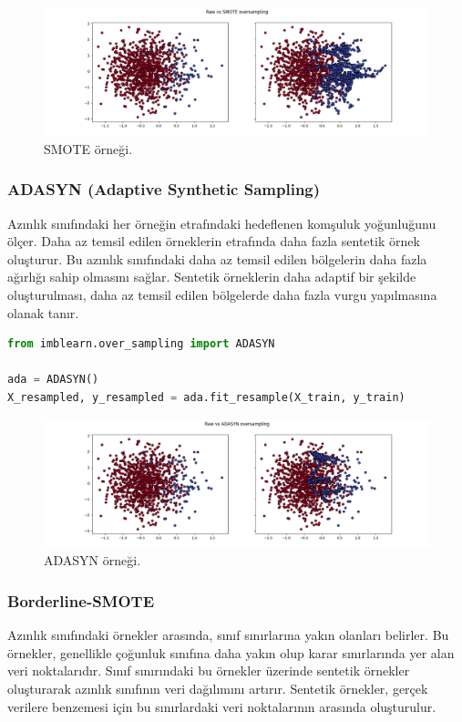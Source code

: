 \begin{figure}[h]
    \centering
    \includegraphics[width=1\textwidth]{images/Raw vs SMOTE oversampling.png}
    \caption{SMOTE örneği.}
    \label{fig:enter-label}
\end{figure}

\subsubsection{ADASYN (Adaptive Synthetic Sampling)}
Azınlık sınıfındaki her örneğin etrafındaki hedeflenen komşuluk yoğunluğunu ölçer. Daha az temsil edilen örneklerin etrafında daha fazla sentetik örnek oluşturur. Bu azınlık sınıfındaki daha az temsil edilen bölgelerin daha fazla ağırlığı sahip olmasını sağlar. Sentetik örneklerin daha adaptif bir şekilde oluşturulması, daha az temsil edilen bölgelerde daha fazla vurgu yapılmasına olanak tanır.

\begin{lstlisting}[language=Python]
from imblearn.over_sampling import ADASYN

ada = ADASYN()
X_resampled, y_resampled = ada.fit_resample(X_train, y_train)
\end{lstlisting}

\newpage

\begin{figure}[h]
    \centering
    \includegraphics[width=1\textwidth]{images/Raw vs ADASYN oversampling.png}
    \caption{ADASYN örneği.}
    \label{fig:enter-label}
\end{figure}

\subsubsection{Borderline-SMOTE}
Azınlık sınıfındaki örnekler arasında, sınıf sınırlarına yakın olanları belirler. Bu örnekler, genellikle çoğunluk sınıfına daha yakın olup karar sınırlarında yer alan veri noktalarıdır. Sınıf sınırındaki bu örnekler üzerinde sentetik örnekler oluşturarak azınlık sınıfının veri dağılımını artırır. Sentetik örnekler, gerçek verilere benzemesi için bu sınırlardaki veri noktalarının arasında oluşturulur.

